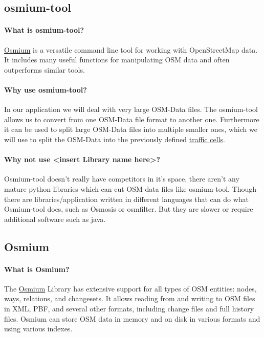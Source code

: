 \documentclass[parskip=full]{report} %
\begin{document}
\subsection{osmium-tool}

\paragraph{What is osmium-tool?}
\href{https://osmcode.org/osmium-tool/}{Osmium}
is a versatile command line tool for working with OpenStreetMap data. It includes many useful functions for manipulating OSM data and often outperforms similar tools.

\paragraph{Why use osmium-tool?}
In our application we will deal with very large OSM-Data files.
The osmium-tool allows us to convert from one OSM-Data file format to another one. 
Furthermore it can be used to split large OSM-Data files into multiple smaller ones, which we will use to split the OSM-Data into the previously defined 
\hyperref[sec:Glossary]{traffic cells}.

\paragraph{Why not use <insert Library name here>?}
Osmium-tool doesn't really have competitors in it's space, there aren't any mature python libraries which can cut OSM-data files like osmium-tool.
Though there are libraries/application written in different languages that can do what Osmium-tool does, such as Osmosis or osmfilter.
But they are slower or require additional software such as java.


\subsection{Osmium}

\paragraph{What is Osmium?}
The \href{https://osmcode.org/libosmium/}{Osmium} Library has extensive support for all types of OSM entities: nodes, ways, relations, and changesets. It allows reading from and writing to OSM files in XML, PBF, and several other formats, including change files and full history files. Osmium can store OSM data in memory and on disk in various formats and using various indexes.
\end{document}

